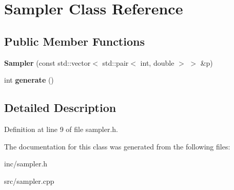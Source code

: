 \hypertarget{classSampler}{}\section{Sampler Class Reference}
\label{classSampler}
\subsection*{Public Member Functions}
\begin{DoxyCompactItemize}
\item 
\mbox{\label{classSampler_a7061f0809fa1f9d6449fdbb4326996b2}} 
{\bfseries Sampler} (const std\+::vector$<$ std\+::pair$<$ int, double $>$ $>$ \&p)
\item 
\mbox{\label{classSampler_a77dc797f2e49dcb22d198b6b42d11237}} 
int {\bfseries generate} ()
\end{DoxyCompactItemize}


\subsection{Detailed Description}


Definition at line 9 of file sampler.\+h.



The documentation for this class was generated from the following files\+:\begin{DoxyCompactItemize}
\item 
inc/sampler.\+h\item 
src/sampler.\+cpp\end{DoxyCompactItemize}
